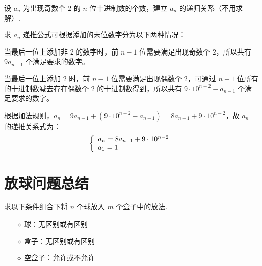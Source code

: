 \documentclass[cn, hazy, blue, normal, 12pt]{elegantnote}
\begin{document}
\begin{exercise}

    设 $a_{n}$ 为出现奇数个 $2$ 的 $n$ 位十进制数的个数，建立 $a_{n}$ 的递归关系（不用求解）.

\end{exercise}

\begin{solution}[print=true]

    求 $a_{n}$ 递推公式可根据添加的末位数字分为以下两种情况：

    当最后一位上添加非 $2$ 的数字时，前 $n-1$ 位需要满足出现奇数个 $2$，所以共有 $9 a_{n-1}$ 个满足要求的数字。

    当最后一位上添加 $2$ 时，前 $n-1$ 位需要满足出现偶数个 $2$，可通过 $n-1$ 位所有的十进制数减去存在偶数个 $2$ 的十进制数得到，所以共有 $9 \cdot 10^{n-2} - a_{n-1}$ 个满足要求的数字。

    根据加法规则，$a_{n}=9  a_{n-1} + \left(9 \cdot 10^{n-2} - a_{n-1}\right) = 8  a_{n-1} + 9 \cdot 10^{n-2}$，故 $a_{n}$ 的递推关系式为：
    \begin{equation}
        \notag
        \left\{\begin{array}{l}
            a_{n} = 8 a_{n-1} + 9 \cdot 10^{n-2} \\
            a_{1} = 1
        \end{array}\right.
    \end{equation}

\end{solution}


\section{放球问题总结}

\begin{exercise}

    求以下条件组合下将 $n$ 个球放入 $m$ 个盒子中的放法.
    \begin{itemize}
        \item[$\diamond$] 球：无区别或有区别
        \item[$\diamond$] 盒子：无区别或有区别
        \item[$\diamond$] 空盒子：允许或不允许
    \end{itemize}

\end{exercise}
\end{document}
